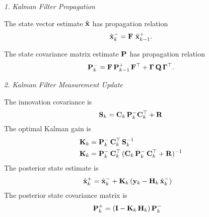 \noindent
\textit{1. Kalman Filter Propagation}

The state vector estimate $\hat{\mathbf{x}}$ has propagation relation
\begin{equation}
	\hat{\mathbf{x}}_{k}^- = \mathbf{F} ~ \hat{\mathbf{x}}_{k-1}^+.
\end{equation}

The state covariance matrix estimate $\mathbf{P}$ has propagation relation
\begin{equation}
	\mathbf{P}_{k}^- = \mathbf{F} \, \mathbf{P}_{k-1}^+ \, \mathbf{F}^\top + \boldsymbol{\Gamma} \, \mathbf{Q} \, \boldsymbol{\Gamma}^\top.
\end{equation}

\noindent
\textit{2. Kalman Filter Measurement Update}

The innovation covariance is 
\begin{equation}
	\mathbf{S}_k = \mathbf{C}_k \, \mathbf{P}^-_k \mathbf{C}_k^\top + \mathbf{R}
\end{equation}
%
The optimal Kalman gain is
\begin{align}
	\mathbf{K}_k &= \mathbf{P}_k^- \, \mathbf{C}_k^\top \, \mathbf{S}_k^{-1} \nonumber \\
	\mathbf{K}_k &= \mathbf{P}_k^- \, \mathbf{C}_k^\top \, (\mathbf{C}_k \, \mathbf{P}_k^- \, \mathbf{C}_k^\top + \mathbf{R})^{-1}
\end{align}
The posterior state estimate is
\begin{align} \label{eqn:posterior_state_estimate}
	\hat{\mathbf{x}}_k^+ &= \hat{\mathbf{x}}_k^- + \mathbf{K}_k \, (\mathbf{y}_k - \mathbf{H}_k \, \hat{\mathbf{x}}_k^-)
\end{align}
The posterior state covariance matrix is
\begin{align} \label{eqn:posterior_state_covar}
	\mathbf{P}_k^+ &= (\mathbf{I} - \mathbf{K}_k \, \mathbf{H}_k) \, \mathbf{P}_k^-
\end{align}